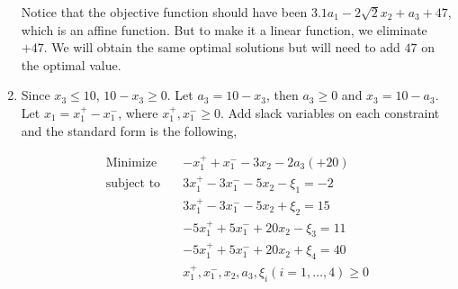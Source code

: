 \documentclass[12pt]{article}
\begin{document}
\begin{enumerate}
Notice that the objective function should have been $3.1a_1 - 2\sqrt{2}x_2 + a_3 + 47$, which is an affine function. But to make it a linear function, we eliminate $+47$. We will obtain the same optimal solutions but will need to add $47$ on the optimal value.


\item

Since $x_3 \leqslant 10$, $10 - x_3 \geqslant 0$. Let $a_3 = 10 - x_3$, then $a_3 \geqslant 0$ and $x_3 = 10 - a_3$.
Let $x_1 = x_1^+ - x_1^-$, where $x_1^+, x_1^- \geqslant 0$. Add slack variables on each constraint and the standard form is the following,

\begin{equation*}
\begin{aligned}
\text{Minimize} \quad & -x_1^+ + x_1^- - 3x_2 - 2a_3 (+ 20) \\
\text{subject\  to} \quad & 3x_1^+ - 3x_1^- - 5x_2 - \xi_1 = -2 \\
& 3x_1^+ - 3x_1^- - 5x_2 + \xi_2 = 15\\
& -5x_1^+ + 5x_1^- + 20x_2 - \xi_3 = 11 \\
& -5x_1^+ + 5x_1^- + 20x_2 + \xi_4 = 40 \\
& x_1^+, x_1^-, x_2, a_3, \xi_i (i = 1,\dots, 4)  \geqslant 0
\end{aligned}
\end{equation*}

\end{enumerate}
\end{document}

